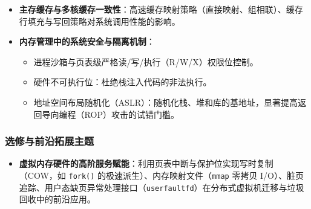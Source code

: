 \begin{itemize}
    \begin{itemize}\setlength{\itemsep}{0pt}\setlength{\parskip}{0pt}
        \item 伙伴系统：解决外部碎片的大块物理内存分配算法。
        \item Slab / Slub 分配器：针对内核频繁申请释放的小型数据对象缓存池。
        \item 空闲链表、大小分级分配器（Size Classes，如 TCMalloc、Jemalloc 思想）。
        \item 大页/巨页机制（2MB / 1GB 大页）：大幅降低大型内存应用的 TLB 未命中开销。
    \end{itemize}
    \item \textbf{主存缓存与多核缓存一致性}：高速缓存映射策略（直接映射、组相联）、缓存行填充与写回策略对系统调用性能的影响。
    \item \textbf{内存管理中的系统安全与隔离机制}：
    \begin{itemize}\setlength{\itemsep}{0pt}\setlength{\parskip}{0pt}
        \item 进程沙箱与页表级严格读/写/执行（R/W/X）权限位控制。
        \item 硬件不可执行位：杜绝栈注入代码的非法执行。
        \item 地址空间布局随机化（ASLR）：随机化栈、堆和库的基地址，显著提高返回导向编程（ROP）攻击的试错门槛。
    \end{itemize}
\end{itemize}

\subsubsection{选修与前沿拓展主题}
\begin{itemize}\setlength{\itemsep}{0pt}\setlength{\parskip}{0pt}
    \item \textbf{虚拟内存硬件的高阶服务赋能}：利用页表中断与保护位实现写时复制（COW，如 \texttt{fork()} 的极速派生）、内存映射文件（\texttt{mmap} 零拷贝 I/O）、脏页追踪、用户态缺页异常处理接口（\texttt{userfaultfd}）在分布式虚拟机迁移与垃圾回收中的前沿应用。
\end{itemize}

